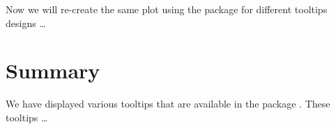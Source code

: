 Now we will re-create the same plot using the  package
for different tooltips designs \ldots{}

\hypertarget{summary}{%
\section{Summary}\label{summary}}

We have displayed various tooltips that are available in the package
. These tooltips \ldots{}



\address{%
Quietest Quokka\\
University of Little Mates\\%
Department of Letter Q\\ Somewhere, Australia\\
%
\url{https://www.britannica.com/animal/quokka}\\%
\textit{ORCiD: \href{https://orcid.org/0000-1721-1511-1101}{0000-1721-1511-1101}}\\%
\href{mailto:qquo@ulm.edu}{\nolinkurl{qquo@ulm.edu}}%
}

\address{%
Bounciest Bilby\\
University of Little Mates\\%
Department of Letter B\\ Somewhere, Australia\\
%
\url{https://www.britannica.com/animal/bilby}\\%
\textit{ORCiD: \href{https://orcid.org/0000-0002-0912-0225}{0000-0002-0912-0225}}\\%
\href{mailto:bbil@ulm.edu}{\nolinkurl{bbil@ulm.edu}}%
}
